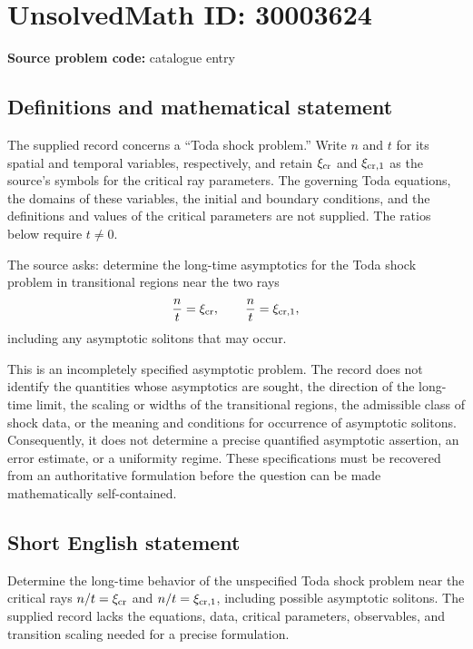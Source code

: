 \documentclass[11pt]{article}
\begin{document}
\section*{UnsolvedMath ID: 30003624}
\textbf{Source problem code:} catalogue entry
\subsection{Definitions and mathematical statement}
The supplied record concerns a ``Toda shock problem.'' Write \(n\) and \(t\) for its spatial and temporal variables, respectively, and retain \(\xi_{\rm cr}\) and \(\xi_{\rm cr,1}\) as the source's symbols for the critical ray parameters. The governing Toda equations, the domains of these variables, the initial and boundary conditions, and the definitions and values of the critical parameters are not supplied. The ratios below require \(t\ne 0\).

The source asks: determine the long-time asymptotics for the Toda shock problem in transitional regions near the two rays
\[
\frac{n}{t}=\xi_{\rm cr},\qquad
\frac{n}{t}=\xi_{\rm cr,1},
\]
including any asymptotic solitons that may occur.

This is an incompletely specified asymptotic problem. The record does not identify the quantities whose asymptotics are sought, the direction of the long-time limit, the scaling or widths of the transitional regions, the admissible class of shock data, or the meaning and conditions for occurrence of asymptotic solitons. Consequently, it does not determine a precise quantified asymptotic assertion, an error estimate, or a uniformity regime. These specifications must be recovered from an authoritative formulation before the question can be made mathematically self-contained.
\subsection{Short English statement}
Determine the long-time behavior of the unspecified Toda shock problem near the critical rays \(n/t=\xi_{\rm cr}\) and \(n/t=\xi_{\rm cr,1}\), including possible asymptotic solitons. The supplied record lacks the equations, data, critical parameters, observables, and transition scaling needed for a precise formulation.
\end{document}
